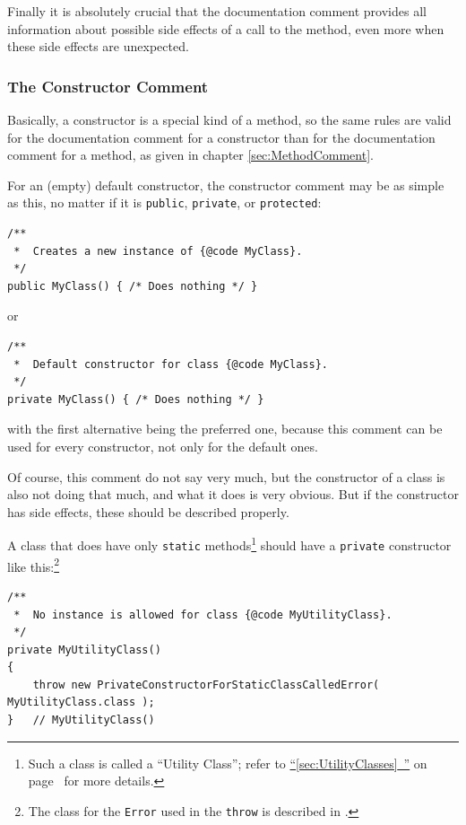 \documentclass[11pt,a4paper, titlepage, parskip=half, headsepline, footsepline, cleardoublepage=current, headheight=1cm]{scrbook}
\newcommand*{\tqfullvref}[1]{\hyperref[{#1}]{“\ref*{#1}~\nameref*{#1}”} on page~\pageref{#1}}
\newcommand*{\tqref}[1]{\hyperref[{#1}]{\ref*{#1}}}
\begin{document}
Finally it is absolutely crucial that the documentation comment provides all information about possible side effects of a call to the method, even more when these side effects are unexpected.


\subsubsection{The Constructor Comment}\label{sec:ConstructorComment}
Basically, a constructor is a special kind of a method, so the same rules are valid for the documentation comment for a constructor than for the documentation comment for a method, as given in chapter \tqref{sec:MethodComment}.

For an (empty) default constructor, the constructor comment may be as simple as this, no matter if it is \lstinline|public|, \lstinline|private|, or \lstinline|protected|:
\begin{lstlisting}
/**
 *  Creates a new instance of {@code MyClass}.
 */
public MyClass() { /* Does nothing */ }
\end{lstlisting}
or
\begin{lstlisting}
/**
 *  Default constructor for class {@code MyClass}.
 */
private MyClass() { /* Does nothing */ }
\end{lstlisting}
with the first alternative being the preferred one, because this comment can be used for every constructor, not only for the default ones.

Of course, this comment do not say very much, but the constructor of a class is also not doing that much, and what it does is very obvious. But if the constructor has side effects, these should be described properly.

A class that does have only \lstinline|static| methods\footnote{Such a class is called a “Utility Class”; refer to \tqfullvref{sec:UtilityClasses} for more details.} should have a \lstinline|private| constructor like this:\footnote{The class for the \lstinline|Error| used in the \lstinline|throw| is described in \autocite{TQUADRAT_ORG_FOUNDATION_PRIVATECONSTRUCTORFORSTATICCLASSCALLEDERROR}.}
\begin{lstlisting}
/**
 *  No instance is allowed for class {@code MyUtilityClass}.
 */
private MyUtilityClass() 
{ 
    throw new PrivateConstructorForStaticClassCalledError( MyUtilityClass.class ); 
}   // MyUtilityClass()
\end{lstlisting}
\end{document}
